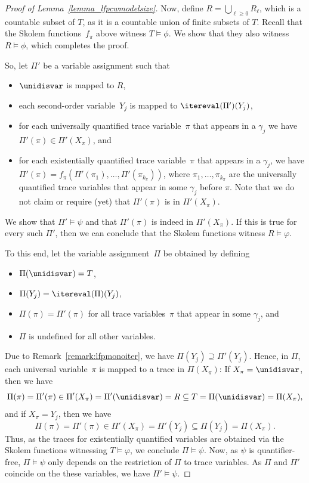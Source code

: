 \begin{proof}[Proof of Lemma~\ref{lemma_lfpcwmodelsize}]
Now, define $R = \bigcup_{\ell \ge 0} R_\ell$, which is a countable subset of $T$, as it is a countable union of finite subsets of $T$.
Recall that the Skolem functions~$f_\pi$ above witness $T \models \phi$.
We show that they also witness $R \models \phi$, which completes the proof.

So, let $\Pi'$ be a variable assignment such that
\begin{itemize}
    \item $\unidisvar$ is mapped to $R$,
    \item each second-order variable~$Y_j$ is mapped to $\itereval(\Pi')(Y_j)$,
    \item for each universally quantified trace variable~$\pi$ that appears in a $\gamma_j$ we have $\Pi'(\pi) \in \Pi'(X_\pi)$, and
    \item for each existentially quantified trace variable~$\pi$ that appears in a $\gamma_j$, we have $\Pi'(\pi) = f_{\pi}(\Pi'(\pi_1), \ldots, \Pi'(\pi_{k_\pi}))$, where $\pi_1, \ldots, \pi_{k_\pi}$ are the universally quantified trace variables that appear in some $\gamma_j$ before $\pi$. Note that we do not claim or require (yet) that $\Pi'(\pi)$ is in $\Pi'(X_\pi)$.
\end{itemize}
We show that $\Pi' \models \psi$ and that $\Pi'(\pi)$ is indeed in $\Pi'(X_\pi)$. 
If this is true for every such $\Pi'$, then we can conclude that the Skolem functions witness $R \models \varphi$.

To this end, let the variable assignment~$\Pi$ be obtained by defining
\begin{itemize}
    \item $\Pi(\unidisvar) = T$, 
    \item $\Pi(Y_j) = \itereval(\Pi)(Y_j)$, 
    \item $\Pi(\pi) = \Pi'(\pi)$ for all trace variables~$\pi$ that appear in some $\gamma_j$, and
    \item $\Pi$ is undefined for all other variables.
\end{itemize}

Due to Remark~\ref{remark:lfpmonoiter}, we have $\Pi(Y_j) \supseteq \Pi'(Y_j)$.
Hence, in $\Pi$, each universal variable~$\pi$ is mapped to a trace in $\Pi(X_\pi)$: If $X_\pi = \unidisvar$, then we have \[\Pi(\pi) = \Pi'(\pi) \in \Pi'(X_\pi) = \Pi'(\unidisvar) = R \subseteq T = \Pi(\unidisvar) = \Pi(X_\pi),\]
and if $X_\pi = Y_j$, then we have
\[
\Pi(\pi) = \Pi'(\pi) \in \Pi'(X_\pi) = \Pi'(Y_j) \subseteq \Pi(Y_j) = \Pi(X_\pi).
\]
Thus, as the traces for existentially quantified variables are obtained via the Skolem functions witnessing $T \models \varphi$, we conclude $\Pi \models \psi$.
Now, as $\psi$ is quantifier-free, $\Pi\models\psi$ only depends on the restriction of $\Pi$ to trace variables. 
As $\Pi$ and $\Pi'$ coincide on the these variables, we have $\Pi'\models\psi$.


\end{proof}
